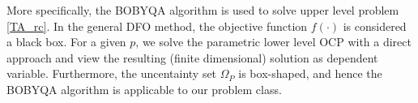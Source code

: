 More specifically, the BOBYQA algorithm is used to solve upper level problem \ref{TA_rc}. In the general DFO method, the objective function $f(\cdot)$ is considered a black box. For a given $p$, we solve the parametric lower level OCP with a direct approach and view the resulting (finite dimensional) solution as dependent variable. Furthermore, the uncentainty set $\Omega_P$ is box-shaped, and hence the BOBYQA algorithm is applicable to our problem class.














